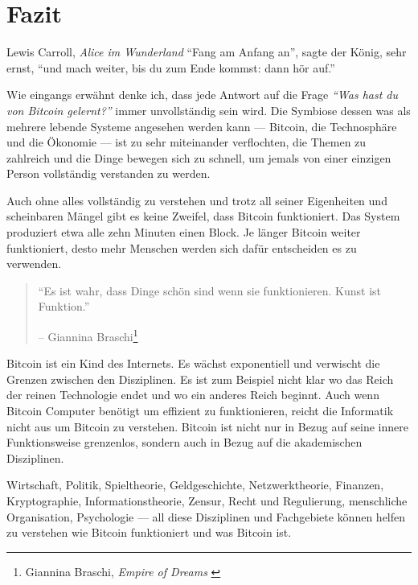 \label{ch:conclusion}

\chapter*{Fazit}

\begin{chapquote}{Lewis Carroll, \textit{Alice im Wunderland}}
\enquote{Fang am Anfang an}, sagte der König, sehr ernst, \enquote{und mach
weiter, bis du zum Ende kommst: dann hör auf.}
\end{chapquote}

Wie eingangs erwähnt denke ich, dass jede Antwort auf die Frage
\textit{\enquote{Was hast du von Bitcoin gelernt?}} immer unvollständig sein
wird. Die Symbiose dessen was als mehrere lebende Systeme angesehen werden kann
--- Bitcoin, die Technosphäre und die Ökonomie --- ist zu sehr miteinander
verflochten, die Themen zu zahlreich und die Dinge bewegen sich zu schnell, um
jemals von einer einzigen Person vollständig verstanden zu werden.

Auch ohne alles vollständig zu verstehen und trotz all seiner Eigenheiten und
scheinbaren Mängel gibt es keine Zweifel, dass Bitcoin funktioniert. Das System
produziert etwa alle zehn Minuten einen Block. Je länger Bitcoin weiter
funktioniert, desto mehr Menschen werden sich dafür entscheiden es zu verwenden.

\begin{quotation}\begin{samepage}
\enquote{Es ist wahr, dass Dinge schön sind wenn sie funktionieren.
Kunst ist Funktion.}
\begin{flushright} -- Giannina Braschi\footnote{Giannina Braschi, \textit{Empire of Dreams} \cite{braschi2011empire}}
\end{flushright}\end{samepage}\end{quotation}

Bitcoin ist ein Kind des Internets. Es wächst exponentiell und
verwischt die Grenzen zwischen den Disziplinen. Es ist zum Beispiel nicht klar
wo das Reich der reinen Technologie endet und wo ein anderes Reich beginnt. Auch
wenn Bitcoin Computer benötigt um effizient zu funktionieren, reicht die
Informatik nicht aus um Bitcoin zu verstehen. Bitcoin ist nicht nur in Bezug auf
seine innere Funktionsweise grenzenlos, sondern auch in Bezug auf die
akademischen Disziplinen.

Wirtschaft, Politik, Spieltheorie, Geldgeschichte, Netzwerktheorie, Finanzen,
Kryptographie, Informationstheorie, Zensur, Recht und Regulierung, menschliche
Organisation, Psychologie --- all diese Disziplinen und Fachgebiete können
helfen zu verstehen wie Bitcoin funktioniert und was Bitcoin ist.

